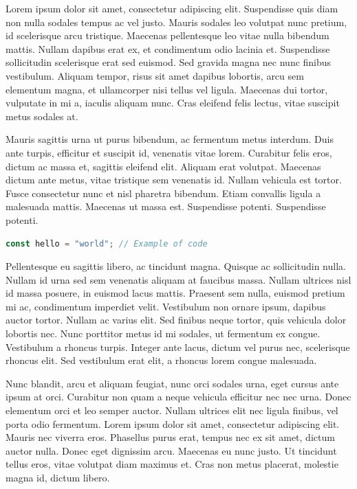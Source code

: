 \documentclass[a4paper,spanish,12pt]{report}
\begin{document}
Lorem ipsum dolor sit amet, consectetur adipiscing elit. Suspendisse quis diam non nulla sodales tempus ac vel justo. Mauris sodales leo volutpat nunc pretium, id scelerisque arcu tristique. Maecenas pellentesque leo vitae nulla bibendum mattis. Nullam dapibus erat ex, et condimentum odio lacinia et. Suspendisse sollicitudin scelerisque erat sed euismod. Sed gravida magna nec nunc finibus vestibulum. Aliquam tempor, risus sit amet dapibus lobortis, arcu sem elementum magna, et ullamcorper nisi tellus vel ligula. Maecenas dui tortor, vulputate in mi a, iaculis aliquam nunc. Cras eleifend felis lectus, vitae suscipit metus sodales at.

Mauris sagittis urna ut purus bibendum, ac fermentum metus interdum. Duis ante turpis, efficitur et suscipit id, venenatis vitae lorem. Curabitur felis eros, dictum ac massa et, sagittis eleifend elit. Aliquam erat volutpat. Maecenas dictum ante metus, vitae tristique sem venenatis id. Nullam vehicula est tortor. Fusce consectetur nunc et nisl pharetra bibendum. Etiam convallis ligula a malesuada mattis. Maecenas ut massa est. Suspendisse potenti. Suspendisse potenti.

\begin{lstlisting}[language=javascript, caption=Code caption.]
const hello = "world"; // Example of code
\end{lstlisting}

Pellentesque eu sagittis libero, ac tincidunt magna. Quisque ac sollicitudin nulla. Nullam id urna sed sem venenatis aliquam at faucibus massa. Nullam ultrices nisl id massa posuere, in euismod lacus mattis. Praesent sem nulla, euismod pretium mi ac, condimentum imperdiet velit. Vestibulum non ornare ipsum, dapibus auctor tortor. Nullam ac varius elit. Sed finibus neque tortor, quis vehicula dolor lobortis nec. Nunc porttitor metus id mi sodales, ut fermentum ex congue. Vestibulum a rhoncus turpis. Integer ante lacus, dictum vel purus nec, scelerisque rhoncus elit. Sed vestibulum erat elit, a rhoncus lorem congue malesuada.

Nunc blandit, arcu et aliquam feugiat, nunc orci sodales urna, eget cursus ante ipsum at orci. Curabitur non quam a neque vehicula efficitur nec nec urna. Donec elementum orci et leo semper auctor. Nullam ultrices elit nec ligula finibus, vel porta odio fermentum. Lorem ipsum dolor sit amet, consectetur adipiscing elit. Mauris nec viverra eros. Phasellus purus erat, tempus nec ex sit amet, dictum auctor nulla. Donec eget dignissim arcu. Maecenas eu nunc justo. Ut tincidunt tellus eros, vitae volutpat diam maximus et. Cras non metus placerat, molestie magna id, dictum libero.
\end{document}
